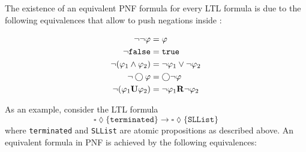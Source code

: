 \documentclass[a4paper, 12pt, twoside]{report}
\begin{document}
	The existence of an equivalent PNF formula for every LTL formula is due to the following equivalences that allow to push negations inside \cite{heinen2015verifyingPhd}:
	
	\begin{align*}
		\neg \neg \varphi &= \varphi\\
		\neg \texttt{false} &= \texttt{true}\\
		\neg (\varphi_1 \wedge \varphi_2) &= \neg \varphi_1 \vee \neg \varphi_2 \\
		\neg \bigcirc \varphi &= \bigcirc \neg \varphi \\
		\neg (\varphi_1 \textbf{\textup{U}} \varphi_2) &= \neg \varphi_1 \textbf{\textup{R}} \neg \varphi_2
	\end{align*}
	
	As an example, consider the LTL formula \[\square \lozenge \{\texttt{terminated}\} \rightarrow \square \lozenge \{\texttt{SLList}\}\] where \texttt{terminated} and \texttt{SLList} are atomic propositions as described above. An equivalent formula in PNF is achieved by the following equivalences:
\end{document}
